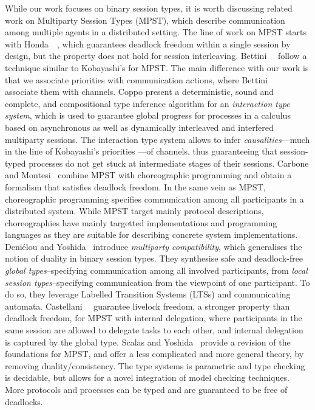 While our work focuses on {binary} session types, it is worth discussing related work on Multiparty Session Types (MPST), which describe communication among multiple agents in a distributed setting. The line of work on MPST starts with Honda~\etal~\cite{hondayoshida08}, which guarantees deadlock freedom {within a single session} by design, but the property does not hold for session interleaving.
Bettini~\etal~\cite{bettinicoppo08} follow a technique similar to Kobayashi's for MPST.
The main difference with our work is that we associate priorities with communication actions, where Bettini~\etal~\cite{bettinicoppo08} associate them with channels.
Coppo \etal \cite{coppoetal13,coppoetal16} present a deterministic, sound and complete, and compositional type inference algorithm for an \emph{interaction type system}, which is used to guarantee global progress for processes in a calculus based on asynchronous as well as dynamically interleaved and interfered multiparty sessions. The interaction type system allows to infer \emph{causalities}---much in the line of Kobayashi's priorities ---of channels, thus guaranteeing that session-typed processes do not get stuck at intermediate stages of their sessions.
Carbone and Montesi~\cite{carbonemontesi13} combine MPST with choreographic programming and obtain a formalism that satisfies deadlock freedom. In the same vein as MPST, choreographic programming specifies communication among all participants in a distributed system. While MPST target mainly protocol descriptions, choreographies have mainly targetted implementations and programming languages as they are suitable for describing concrete system implementations.
Deni\'{e}lou and Yoshida~\cite{DenielouY13} introduce \emph{multiparty compatibility}, which generalises the notion of duality in binary session types. They synthesise safe and deadlock-free \emph{global types}--specifying communication among {all} involved participants, from \emph{local session types}--specifying communication from the viewpoint of {one} participant. To do so, they leverage Labelled Transition Systems (LTSs) and communicating automata.
Castellani~\etal~\cite{CastellaniDGH20} guarantee livelock freedom, a stronger property than deadlock freedom, for MPST with {internal delegation}, where participants in the same session are allowed to delegate tasks to each other, and internal delegation is captured by the global type.
Scalas and Yoshida~\cite{scalasyoshida19} provide a revision of the foundations for MPST, and offer a less complicated and more general theory, by removing duality/consistency. The type systems is parametric and type checking is decidable, but allows for a novel integration of model checking techniques. More protocols and processes can be typed and are guaranteed to be free of deadlocks.


